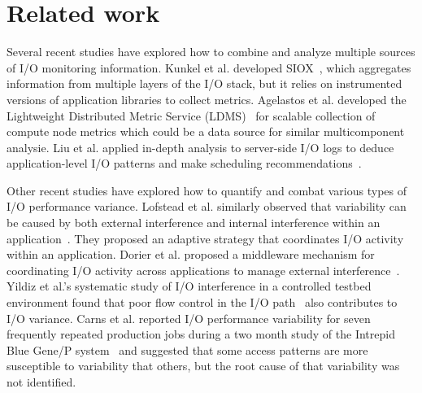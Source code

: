 \section{Related work} \label{sec:related}

Several recent studies have explored how to combine and analyze multiple sources of I/O monitoring information.
Kunkel et al. developed SIOX~\cite{Kunkel:2014:SAC:2769884.2769901}, which aggregates information from multiple layers of the I/O stack,%
but it relies on instrumented versions of application libraries to collect metrics.
Agelastos et al. developed the Lightweight Distributed Metric Service (LDMS)~\cite{7013000} for scalable collection of compute node metrics which could be a data source for similar multicomponent analysie.
Liu et al. applied in-depth analysis to server-side I/O logs to deduce application-level I/O patterns and make scheduling recommendations~\cite{Liu2016}.

Other recent studies have explored how to quantify and combat various types of I/O performance variance.
Lofstead et al. similarly observed that variability can be caused by both external interference and internal interference within an application~\cite{Lofstead2010}.
They proposed an adaptive strategy that coordinates I/O activity within an application.
Dorier et al. proposed a middleware mechanism for coordinating I/O activity across applications to manage external interference~\cite{dorier2014calciom}.
Yildiz et al.'s systematic study of I/O interference in a controlled testbed environment found that poor flow control in the I/O path~\cite{Yildiz2016} also contributes to I/O variance.
Carns et al. reported I/O performance variability for seven frequently repeated production jobs during a two month study of the Intrepid Blue Gene/P system~\cite{carns2011understanding} and suggested that some access patterns are more susceptible to variability that others, but the root cause of that variability was not identified.



